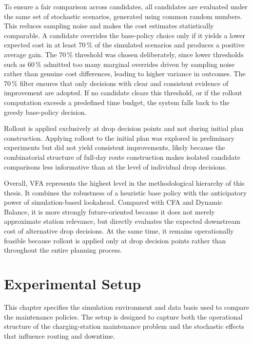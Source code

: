 \documentclass[12pt,oneside]{article}
\begin{document}
To ensure a fair comparison across candidates, all candidates are evaluated under the same set of stochastic scenarios, generated using common random numbers. This reduces sampling noise and makes the cost estimates statistically comparable. A candidate overrides the base-policy choice only if it yields a lower expected cost in at least 70\,\% of the simulated scenarios and produces a positive average gain. The 70\,\% threshold was chosen deliberately, since lower thresholds such as 60\,\% admitted too many marginal overrides driven by sampling noise rather than genuine cost differences, leading to higher variance in outcomes. The 70\,\% filter ensures that only decisions with clear and consistent evidence of improvement are adopted. If no candidate clears this threshold, or if the rollout computation exceeds a predefined time budget, the system falls back to the greedy base-policy decision.

Rollout is applied exclusively at drop decision points and not during initial plan construction. Applying rollout to the initial plan was explored in preliminary experiments but did not yield consistent improvements, likely because the combinatorial structure of full-day route construction makes isolated candidate comparisons less informative than at the level of individual drop decisions.

Overall, VFA represents the highest level in the methodological hierarchy of this thesis. It combines the robustness of a heuristic base policy with the anticipatory power of simulation-based lookahead. Compared with CFA and Dynamic Balance, it is more strongly future-oriented because it does not merely approximate station relevance, but directly evaluates the expected downstream cost of alternative drop decisions. At the same time, it remains operationally feasible because rollout is applied only at drop decision points rather than throughout the entire planning process.

\section{Experimental Setup}\label{sec:experimental_setup}
This chapter specifies the simulation environment and data basis used to compare the maintenance policies. The setup is designed to capture both the operational structure of the charging-station maintenance problem and the stochastic effects that influence routing and downtime.
\end{document}
